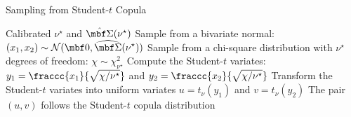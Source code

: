 \documentclass[12pt,a4paper]{article}
\begin{document}
\begin{algorithm}[H]
\label{alg:sampling_student-t}
\caption{Sampling from Student-$t$ Copula}
\begin{algorithmic}[1]
\Require Calibrated $\nu^\star$ and $\hat{\mbf \Sigma}(\nu^\star)$ %
\State Sample from a bivariate normal: $\displaystyle (x_1, x_2) \sim \mathcal{N}(\mbf 0, \widehat{\mbf \Sigma}(\nu^{\star}))$ 
\State Sample from a chi-square distribution with $\nu^\star$ degrees of freedom: $\displaystyle \chi \sim \chi^2_{\nu^\star}$
\State Compute the Student-$t$ variates: $y_1 = \fraccc{x_1}{\sqrt{\chi/\nu^{\star}}}$ and $y_2 = \fraccc{x_2}{\sqrt{\chi/\nu^{\star}}}$
\State Transform the Student-$t$ variates into uniform variates %
$u = t_{\nu}(y_1)$ and $v = t_{\nu}(y_2)$ 
\Ensure The pair $(u,v)$ follows the Student-$t$ copula distribution
\end{algorithmic}
\end{algorithm}
\end{document}
